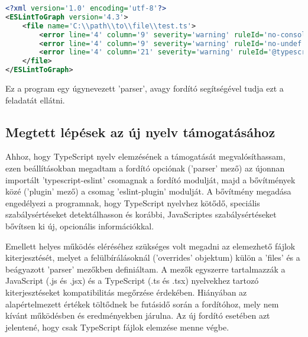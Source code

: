 \begin{lstlisting}[caption={ESLintRunner kimeneti fájl példa},label={lst:eslintoutput}, language={xml}]
<?xml version='1.0' encoding='utf-8'?>
<ESLintToGraph version='4.3'>
    <file name='C:\\path\\to\\file\\test.ts'>
        <error line='4' column='9' severity='warning' ruleId='no-console' nodeType='MemberExpression' message='Unexpected console statement.' />
        <error line='4' column='9' severity='warning' ruleId='no-undef' nodeType='Identifier' message=' &apos; console &apos;  is not defined.' />
        <error line='4' column='21' severity='warning' ruleId='@typescript-eslint/restrict-plus-operands' nodeType='BinaryExpression' message='Operands of  &apos; + &apos;  operation must either be both strings or both numbers. Consider using a template literal.' />
    </file>
</ESLintToGraph>

\end{lstlisting}

Ez a program egy úgynevezett 'parser', avagy fordító segítségével tudja ezt a feladatát ellátni.

\subsection{Megtett lépések az új nyelv támogatásához}

Ahhoz, hogy TypeScript nyelv elemzésének a támogatását megvalósíthassam, ezen beállításokban megadtam a fordító opciónak ('parser' mező) az újonnan importált 'typescript-eslint' csomagnak a  fordító modulját, majd a bővítmények közé ('plugin' mező) a csomag 'eslint-plugin' modulját. 
A bővítmény megadása engedélyezi a programnak, hogy TypeScript nyelvhez kötődő, speciális szabálysértéseket detektálhasson és korábbi, JavaScriptes szabálysértéseket bővítsen ki új, opcionális információkkal. 

Emellett helyes működés eléréséhez szükséges volt megadni az elemezhető fájlok kiterjesztését, melyet a felülbírálásoknál ('overrides' objektum) külön a 'files' és a beágyazott 'parser' mezőkben definiáltam. A mezők egyszerre tartalmazzák a JavaScript (.js és .jsx) és a TypeScript (.ts és .tsx) nyelvekhez tartozó kiterjesztéseket kompatibilitás megőrzése érdekében. Hiányában az alapértelmezett értékek töltődnek be futásidő során a fordítóhoz, mely nem kívánt működésben és eredményekben járulna. Az új fordító esetében azt jelentené, hogy csak TypeScript fájlok elemzése menne végbe.

